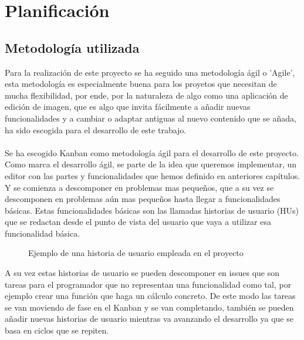 \chapter{Planificación}

\section{Metodología utilizada}
    Para la realización de este proyecto se ha seguido una metodología ágil o 'Agile', esta metodología
    es especialmente buena para los proyetos que necesitan de mucha flexibilidad, por ende, por 
    la naturaleza de algo como una aplicación de edición de imagen, que es algo que invita fácilmente a 
    añadir nuevas funcionalidades y a cambiar o adaptar antiguas al nuevo contenido que se añada,
    ha sido escogida para el desarrollo de este trabajo.
    \\\\
    Se ha escogido Kanban como metodología ágil para el desarrollo de este proyecto.
    Como marca el desarrollo ágil, se parte de la idea que queremos implementar, un editor
    con las partes y funcionalidades que hemos definido en anteriores capítulos. Y se comienza
    a descomponer en problemas mas pequeños, que a su vez se descomponen en problemas aún mas 
    pequeños hasta llegar a funcionalidades básicas. 
    Estas funcionalidades básicas son las llamadas historias de usuario (HUs) que se redactan 
    desde el punto de vista del usuario que vaya a utilizar esa funcionalidad básica.

    \begin{figure}[!h]
      \centering
      \noindent{}
      \caption{Ejemplo de una historia de usuario empleada en el proyecto}
    \end{figure}
    
    A su vez estas historias de usuario se pueden descomponer en issues que son tareas para
    el programador que no representan una funcionalidad como tal, por ejemplo crear una 
    función que haga un cálculo concreto. De este modo las tareas se van moviendo de fase
    en el Kanban y se van completando, también se pueden añadir nuevas historias de usuario
    mientras va avanzando el desarrollo ya que se basa en ciclos que se repiten.

